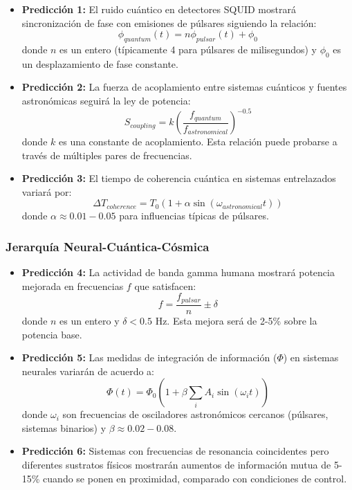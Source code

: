 \documentclass[12pt]{article}
\begin{document}
\begin{itemize}
    \item \textbf{Predicción 1:} El ruido cuántico en detectores SQUID mostrará sincronización de fase con emisiones de púlsares siguiendo la relación:
    \begin{equation}
    \phi_{quantum}(t) = n\phi_{pulsar}(t) + \phi_0
    \end{equation}
    donde $n$ es un entero (típicamente 4 para púlsares de milisegundos) y $\phi_0$ es un desplazamiento de fase constante.
    
    \item \textbf{Predicción 2:} La fuerza de acoplamiento entre sistemas cuánticos y fuentes astronómicas seguirá la ley de potencia:
    \begin{equation}
    S_{coupling} = k\left(\frac{f_{quantum}}{f_{astronomical}}\right)^{-0.5}
    \end{equation}
    donde $k$ es una constante de acoplamiento. Esta relación puede probarse a través de múltiples pares de frecuencias.
    
    \item \textbf{Predicción 3:} El tiempo de coherencia cuántica en sistemas entrelazados variará por:
    \begin{equation}
    \Delta T_{coherence} = T_0(1 + \alpha\sin(\omega_{astronomical}t))
    \end{equation}
    donde $\alpha \approx 0.01-0.05$ para influencias típicas de púlsares.
\end{itemize}

\subsubsection{Jerarquía Neural-Cuántica-Cósmica}

\begin{itemize}
    \item \textbf{Predicción 4:} La actividad de banda gamma humana mostrará potencia mejorada en frecuencias $f$ que satisfacen:
    \begin{equation}
    f = \frac{f_{pulsar}}{n} \pm \delta
    \end{equation}
    donde $n$ es un entero y $\delta < 0.5$ Hz. Esta mejora será de 2-5\% sobre la potencia base.
    
    \item \textbf{Predicción 5:} Las medidas de integración de información ($\Phi$) en sistemas neurales variarán de acuerdo a:
    \begin{equation}
    \Phi(t) = \Phi_0(1 + \beta\sum_i A_i\sin(\omega_i t))
    \end{equation}
    donde $\omega_i$ son frecuencias de osciladores astronómicos cercanos (púlsares, sistemas binarios) y $\beta \approx 0.02-0.08$.
    
    \item \textbf{Predicción 6:} Sistemas con frecuencias de resonancia coincidentes pero diferentes sustratos físicos mostrarán aumentos de información mutua de 5-15\% cuando se ponen en proximidad, comparado con condiciones de control.
\end{itemize}
\end{document}
